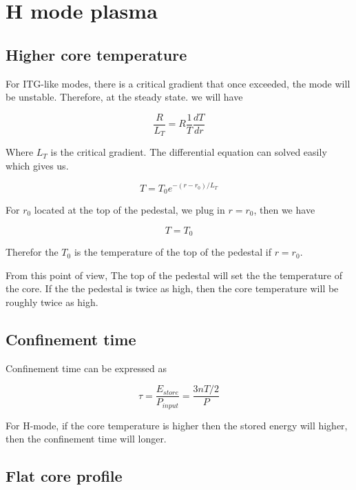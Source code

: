 \section{H mode plasma}

\subsection{Higher core temperature}
For ITG-like modes, there is a critical gradient that once exceeded, the mode will be unstable. Therefore, at the steady state. we will have

\begin{equation}
    \frac{R}{L_{T}}=R \frac{1}{T}\frac{dT}{dr}
\end{equation}

Where $L_T$ is the critical gradient. The differential equation can solved easily which gives us. 

\begin{equation}
    T=T_0 e^{-(r-r_0)/L_T}
\end{equation}

For $r_0$ located at the top of the pedestal, we plug in $r=r_0$, then we have

\begin{equation}
    T=T_0
\end{equation}

Therefor the $T_0$ is the temperature of the top of the pedestal if $r=r_0$. 

From this point of view, The top of the pedestal will set the the temperature of the core. If the the pedestal is twice as high, then the core temperature will be roughly twice as high. 

\subsection{Confinement time}

Confinement time can be expressed as 

\begin{equation}
    \tau=\frac{E_{store}}{P_{input}}=\frac{3nT/2}{P} 
\end{equation}

For H-mode, if the core temperature is higher then the stored energy will higher, then the confinement time will longer. 

\subsection{Flat core profile}


